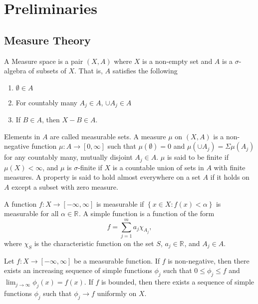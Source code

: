 \chapter{Preliminaries}
\thispagestyle{myheadings}

\section{Measure Theory}

\begin{definition}
  A Measure space is a pair $(X,A)$ where $X$ is a non-empty set and $A$ is a $\sigma$-algebra of subsets of $X$.
  That is, $A$ satisfies the following
  \begin{enumerate}
    \item $\emptyset \in A$
    \item For countably many $A_{j} \in A$, $\cup A_{j} \in A$ 
    \item If $B \in A$, then $X - B \in A$.
  \end{enumerate}
\end{definition}

Elements in $A$ are called measurable sets.
A measure $\mu$ on $(X,A)$ is a non-negative function $ \mu : A \to [0,\infty] $ such that $\mu(\emptyset) = 0$ and $\mu(\cup A_{j}) = \Sigma \mu(A_{j})$ for any countably many, mutually disjoint $A_{j} \in A$.
$\mu$ is said to be finite if $\mu(X) < \infty$, and $\mu$ is $\sigma$-finite if $X$ is a countable union of sets in $A$ with finite measures.
A property is said to hold almost everywhere on a set $A$ if it holds on $A$ except a subset with zero measure.

A function $ f : X \to [-\infty, \infty] $ is measurable if $ \left\{ x \in X : f(x) < \alpha \right\}$ is measurable for all $\alpha \in \mathbb{R}^{} $.
A simple function  is a function of the form
\[
f = \sum_{j=1}^m a_{j}\chi_{A_{j}} 
,\] 
where $\chi_{S}$ is the characteristic function on the set $S$, $a_{j} \in \mathbb{R}^{} $, and $A_{j} \in A$.

\begin{theorem}
  Let $ f : X \to [-\infty, \infty] $ be a measurable function.
  If $f$ is non-negative, then there exists an increasing sequence of simple functions $\phi_{j}$ such that $0 \leq \phi_{j} \leq f$ and $\lim_{j \to \infty} \phi_{j}(x) = f(x)$.
  If $f$ is bounded, then there exists a sequence of simple functions $\phi_{j}$ such that $\phi_{j} \to f$ uniformly on $X$.
\end{theorem}

